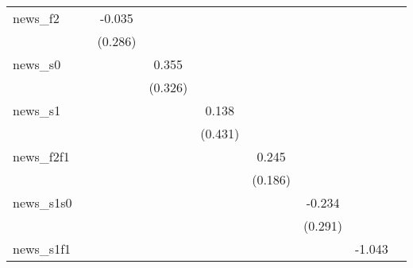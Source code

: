 {\begin{tabular}{l*{8}{c}}
\addlinespace
news\_f2     &                     &      -0.035         &                     &                     &                     &                     &                     &                     \\
            &                     &     (0.286)         &                     &                     &                     &                     &                     &                     \\
\addlinespace
news\_s0     &                     &                     &       0.355         &                     &                     &                     &                     &                     \\
            &                     &                     &     (0.326)         &                     &                     &                     &                     &                     \\
\addlinespace
news\_s1     &                     &                     &                     &       0.138         &                     &                     &                     &                     \\
            &                     &                     &                     &     (0.431)         &                     &                     &                     &                     \\
\addlinespace
news\_f2f1   &                     &                     &                     &                     &       0.245         &                     &                     &                     \\
            &                     &                     &                     &                     &     (0.186)         &                     &                     &                     \\
\addlinespace
news\_s1s0   &                     &                     &                     &                     &                     &      -0.234         &                     &                     \\
            &                     &                     &                     &                     &                     &     (0.291)         &                     &                     \\
\addlinespace
news\_s1f1   &                     &                     &                     &                     &                     &                     &      -1.043\sym{**} &                     \\

\end{tabular}}

